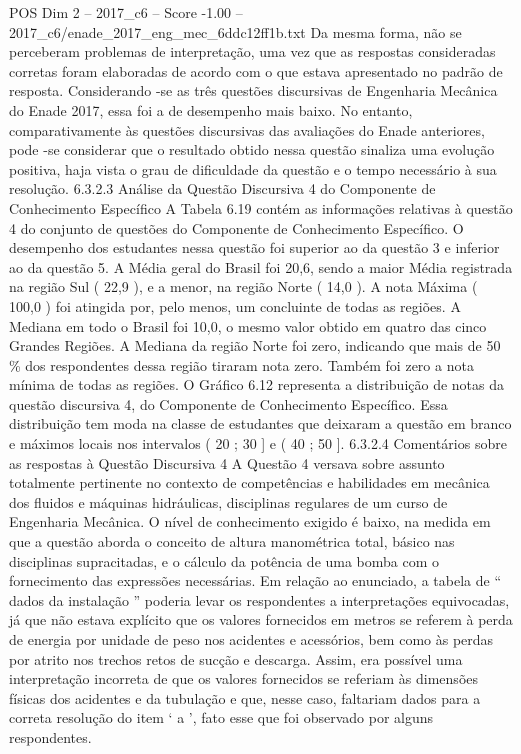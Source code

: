 \begin{textsample}{POS Dim 2 – 2017\_c6 – Score -1.00 – 2017\_c6/enade\_2017\_eng\_mec\_6ddc12ff1b.txt}
Da mesma forma, não se perceberam problemas de interpretação, uma vez que as respostas consideradas corretas foram elaboradas de acordo com o que estava apresentado no padrão de resposta.
Considerando -se as três questões discursivas de Engenharia Mecânica do Enade 2017, essa foi a de desempenho mais baixo.
No entanto, comparativamente às questões discursivas das avaliações do Enade anteriores, pode -se considerar que o resultado obtido nessa questão sinaliza uma evolução positiva, haja vista o grau de dificuldade da questão e o tempo necessário à sua resolução. 6.3.2.3 Análise da Questão Discursiva 4 do Componente de Conhecimento Específico A Tabela 6.19 contém as informações relativas à questão 4 do conjunto de questões do Componente de Conhecimento Específico.
O desempenho dos estudantes nessa questão foi superior ao da questão 3 e inferior ao da questão 5.
A Média geral do Brasil foi 20,6, sendo a maior Média registrada na região Sul ( 22,9 ), e a menor, na região Norte ( 14,0 ).
A nota Máxima ( 100,0 ) foi atingida por, pelo menos, um concluinte de todas as regiões.
A Mediana em todo o Brasil foi 10,0, o mesmo valor obtido em quatro das cinco Grandes Regiões.
A Mediana da região Norte foi zero, indicando que mais de 50 \% dos respondentes dessa região tiraram nota zero.
Também foi zero a nota mínima de todas as regiões.
O Gráfico 6.12 representa a distribuição de notas da questão discursiva 4, do Componente de Conhecimento Específico.
Essa distribuição tem moda na classe de estudantes que deixaram a questão em branco e máximos locais nos intervalos ( 20 ; 30 ] e ( 40 ; 50 ]. 6.3.2.4 Comentários sobre as respostas à Questão Discursiva 4 A Questão 4 versava sobre assunto totalmente pertinente no contexto de competências e habilidades em mecânica dos fluidos e máquinas hidráulicas, disciplinas regulares de um curso de Engenharia Mecânica.
O nível de conhecimento exigido é baixo, na medida em que a questão aborda o conceito de altura manométrica total, básico nas disciplinas supracitadas, e o cálculo da potência de uma bomba com o fornecimento das expressões necessárias.
Em relação ao enunciado, a tabela de “ dados da instalação ” poderia levar os respondentes a interpretações equivocadas, já que não estava explícito que os valores fornecidos em metros se referem à perda de energia por unidade de peso nos acidentes e acessórios, bem como às perdas por atrito nos trechos retos de sucção e descarga.
Assim, era possível uma interpretação incorreta de que os valores fornecidos se referiam às dimensões físicas dos acidentes e da tubulação e que, nesse caso, faltariam dados para a correta resolução do item ‘ a ’, fato esse que foi observado por alguns respondentes.

\end{textsample}
